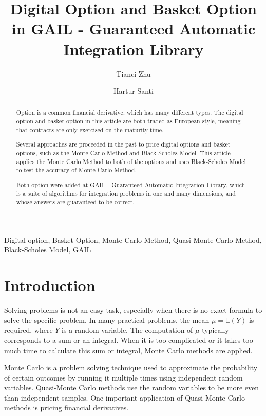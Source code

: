 \documentclass[]{elsarticle}
\theoremstyle{definition}
\theoremstyle{remark}
\begin{document}
\begin{frontmatter}
\title{Digital Option and Basket Option in GAIL - Guaranteed Automatic Integration Library}
\author{Tianci Zhu}
\author{Hartur Santi}
\address{Department of Applied Mathematics, Illinois Institute of Technology, Illinois, USA}

\begin{abstract}

Option is a common financial derivative, which has many different types. The digital option and basket option in this article are both traded as European style, meaning that contracts are only exercised on the maturity time.

Several approaches are proceeded in the past to price digital options and basket options, such as the Monte Carlo Method and Black-Scholes Model. This article applies the Monte Carlo Method to both of the options and uses Black-Scholes Model to test the accuracy of Monte Carlo Method.

Both option were added at GAIL - Guaranteed Automatic Integration Library, which is a suite of algorithms for integration problems in one and many dimensions, and whose answers are guaranteed to be correct.

\end{abstract}

\begin{keyword}
Digital option, Basket Option, Monte Carlo Method, Quasi-Monte Carlo Method, Black-Scholes Model, GAIL
\end{keyword}
\end{frontmatter}

\section{Introduction}

Solving problems is not an easy task, especially when there is no exact formula to solve the specific problem. In many practical problems, the mean $\mu=\mathbb{E}(Y)$ is required, where $Y$ is a random variable. The computation of $\mu$ typically corresponds to a sum or an integral. When it is too complicated or it takes too much time to calculate this sum or integral, Monte Carlo methods are applied.

Monte Carlo is a problem solving technique used to approximate the probability of certain outcomes by running it multiple times using independent random variables. Quasi-Monte Carlo methods use the random variables to be more even than independent samples. One important application of Quasi-Monte Carlo methods is pricing financial derivatives.
\end{document}
